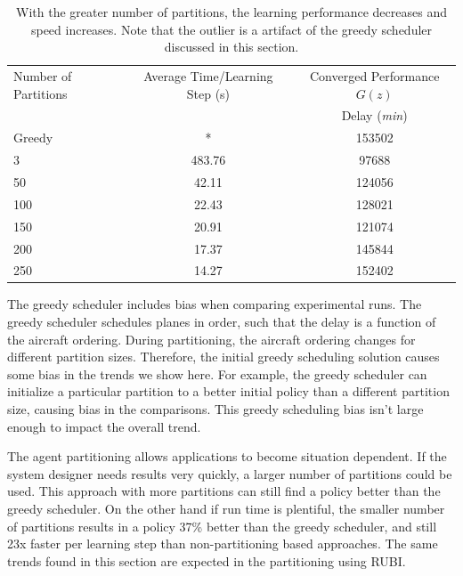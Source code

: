 \documentclass[smallcondensed]{svjour3}
\begin{document}

\begin{table}
\begin{tabular}{|l|c|c|}
\hline
Number of Partitions & Average Time/Learning Step (s) & Converged Performance $G(z)$\\
&  & Delay (\textit{min}) \\
\hline
Greedy & * & 153502 \\
\hline
3 & 483.76 & 97688 \\
\hline
50 & 42.11 & 124056 \\
\hline
100 & 22.43 & 128021 \\
\hline
150 & 20.91 & 121074 \\
\hline
200 & 17.37 & 145844\\
\hline
250 & 14.27 & 152402 \\
\hline
\end{tabular}
\caption{With the greater number of partitions, the learning performance decreases and speed increases. Note that the outlier is a artifact of the greedy scheduler discussed in this section.}
\label{ATFMPOldTable}
\end{table}

The greedy scheduler includes bias when comparing experimental runs. The greedy scheduler schedules planes in order, such that the delay is a function of the aircraft ordering. During partitioning, the aircraft ordering changes for different partition sizes. Therefore, the initial greedy scheduling solution causes some bias in the trends we show here. For example, the greedy scheduler can initialize a particular partition to a better initial policy than a different partition size, causing bias in the comparisons. This greedy scheduling bias isn't large enough to impact the overall trend.

The agent partitioning allows applications to become situation dependent. If the system designer needs results very quickly, a larger number of partitions could be used. This approach with more partitions can still find a policy better than the greedy scheduler. On the other hand if run time is plentiful, the smaller number of partitions results in a policy 37\% better than the greedy scheduler, and still 23x faster per learning step than non-partitioning based approaches. The same trends found in this section are expected in the partitioning using RUBI.
\end{document}
